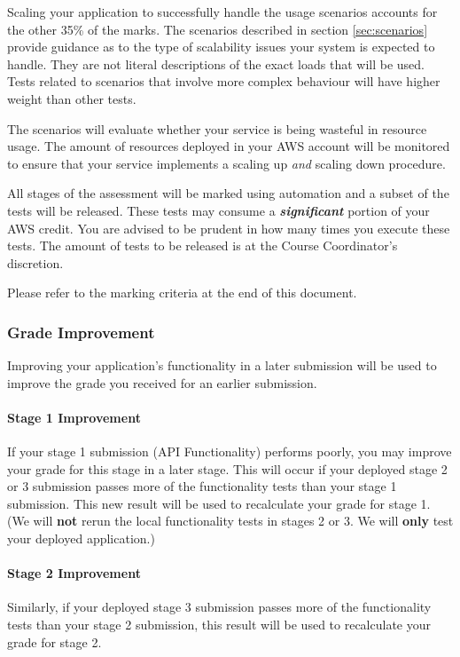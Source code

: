 \documentclass{csse4400}
\begin{document}
Scaling your application to successfully handle the usage scenarios accounts for the other 35\% of the marks. The scenarios described in section \ref{sec:scenarios} provide guidance as to the type of scalability issues your system is expected to handle. They are not literal descriptions of the exact loads that will be used. Tests related to scenarios that involve more complex behaviour will have higher weight than other tests.

The scenarios will evaluate whether your service is being wasteful in resource usage. The amount of resources deployed in your AWS account will be monitored to ensure that your service implements a scaling up \emph{and} scaling down procedure.

All stages of the assessment will be marked using automation and a subset of the tests will be released. These tests may consume a \textbf{\emph{significant}} portion of your AWS credit. You are advised to be prudent in how many times you execute these tests. The amount of tests to be released is at the Course Coordinator's discretion.

Please refer to the marking criteria at the end of this document.

\subsubsection{Grade Improvement}\label{sec:improve}
Improving your application's functionality in a later submission will be used to improve the grade you received for an earlier submission.

\paragraph{Stage 1 Improvement}
If your stage 1 submission (API Functionality) performs poorly, you may improve your grade for this stage in a later stage.
This will occur if your deployed stage 2 or 3 submission passes more of the functionality tests than your stage 1 submission.
This new result will be used to recalculate your grade for stage 1.
(We will \textbf{not} rerun the local functionality tests in stages 2 or 3. We will \textbf{only} test your deployed application.)

\paragraph{Stage 2 Improvement}
Similarly, if your deployed stage 3 submission passes more of the functionality tests than your stage 2 submission, this result will be used to recalculate your grade for stage 2.
\end{document}
